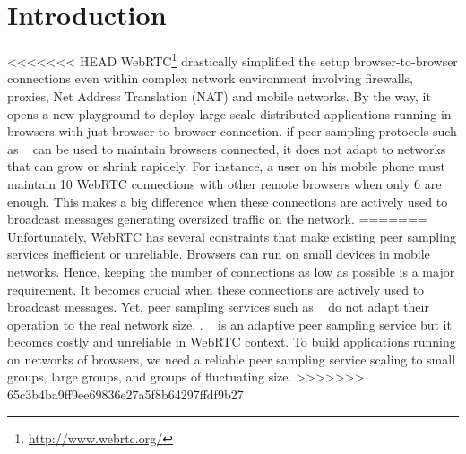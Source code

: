 
\section{Introduction}


<<<<<<< HEAD
WebRTC\footnote{\url{http://www.webrtc.org/}} drastically simplified
the setup browser-to-browser connections even within complex network
environment involving firewalls, proxies, Net Address Translation
(NAT) and mobile networks. By the way, it opens a new playground to
deploy large-scale distributed applications running in browsers with
just browser-to-browser connection. if peer sampling protocols such as
\CYCLON~\cite{voulgaris2005cyclon} can be used to maintain browsers
connected, it does not adapt to networks that can grow or shrink
rapidely. For instance, a user on his mobile phone must maintain 10
WebRTC connections with other remote browsers when only 6 are
enough. This makes a big difference when these connections are
actively used to broadcast messages generating oversized traffic on
the network.
=======
Unfortunately, WebRTC has several constraints that make existing peer sampling
services inefficient or unreliable. Browsers can run on small devices in mobile
networks. Hence, keeping the number of connections as low as possible is a major
requirement. It becomes crucial when these connections are actively used to
broadcast messages. Yet, peer sampling services such as
\CYCLON~\cite{voulgaris2005cyclon} do not adapt their operation to the real
network size. . \SCAMP~\cite{ganesh2003peer} is an adaptive peer sampling service but
it becomes costly and unreliable in WebRTC context. To build applications
running on networks of browsers, we need a reliable peer sampling service
scaling to small groups, large groups, and groups of fluctuating size.
>>>>>>> 65c3b4ba9ff9ee69836e27a5f8b64297ffdf9b27

